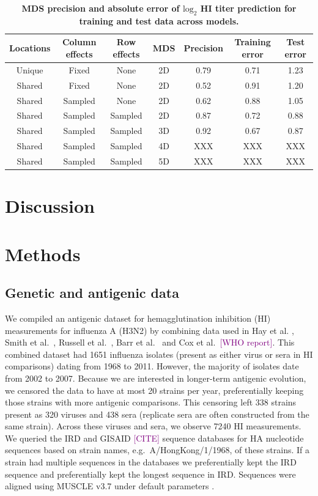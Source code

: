 \documentclass[11pt,oneside,letterpaper]{article}
\def\tbc#1{\textcolor{purple}{[#1]}}
\begin{document}
\begin{table}[tb]
	\centering
	\caption{\textbf{MDS precision and absolute error of $\mathrm{log}_2$ HI titer prediction for training and test data across models.}}
	\label{errortable}
	\begin{tabular*}{1.0\textwidth}{ c c c c c c c } 
	\hline
	Locations 	& 	Column effects 	&	Row effects	&	MDS		&	Precision	& 	Training error	& 	Test error	\\
	\hline				
	Unique 		&	Fixed 			&	None		&	2D		&	0.79		& 	0.71			&	1.23		\\
	Shared		&	Fixed			&	None		&	2D		&	0.52		&	0.91			&	1.20		\\
	Shared		&	Sampled			&	None		&	2D		&	0.62		&	0.88			&	1.05		\\
	Shared		&	Sampled			&	Sampled		&	2D		&	0.87		&	0.72			&	0.88		\\
	Shared		&	Sampled			&	Sampled		&	3D		&	0.92		&	0.67			&	0.87		\\
	Shared		&	Sampled			&	Sampled		&	4D		&	XXX			&	XXX				&	XXX			\\
	Shared		&	Sampled			&	Sampled		&	5D		&	XXX			&	XXX				&	XXX			\\	
	\hline
	\end{tabular*}
\end{table}

\section*{Discussion}

\section*{Methods}

\subsection*{Genetic and antigenic data}

We compiled an antigenic dataset for hemagglutination inhibition (HI) measurements for influenza A (H3N2) by combining data used in Hay et al. \cite{Hay01}, Smith et al.\ \cite{Smith04}, Russell et al.\ \cite{Russell08}, Barr et al.\ \cite{Barr10} and Cox et al.\ \tbc{WHO report}. 
This combined dataset had 1651 influenza isolates (present as either virus or sera in HI comparisons) dating from 1968 to 2011. 
However, the majority of isolates date from 2002 to 2007. 
Because we are interested in longer-term antigenic evolution, we censored the data to have at most 20 strains per year, preferentially keeping those strains with more antigenic comparisons. 
This censoring left 338 strains present as 320 viruses and 438 sera (replicate sera are often constructed from the same strain). 
Across these viruses and sera, we observe 7240 HI measurements. 
We queried the IRD \cite{IRD} and GISAID \tbc{CITE} sequence databases for HA nucleotide sequences based on strain names, e.g.\ A/HongKong/1/1968, of these strains. 
If a strain had multiple sequences in the databases we preferentially kept the IRD sequence and preferentially kept the longest sequence in IRD. 
Sequences were aligned using MUSCLE v3.7 under default parameters \cite{MUSCLE}.
\end{document}
